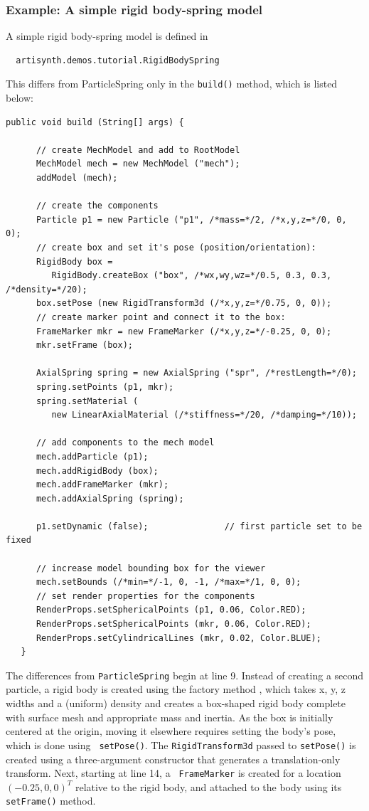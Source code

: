 \subsubsection{Example: A simple rigid body-spring model}
\label{RigidBodySpringExample:sec}

A simple rigid body-spring model is defined in
%
\begin{verbatim}
  artisynth.demos.tutorial.RigidBodySpring
\end{verbatim}
%
This differs from ParticleSpring only in the {\tt build()} method,
which is listed below:
\lstset{numbers=left}
\begin{lstlisting}[]
   public void build (String[] args) {

      // create MechModel and add to RootModel
      MechModel mech = new MechModel ("mech");
      addModel (mech);

      // create the components
      Particle p1 = new Particle ("p1", /*mass=*/2, /*x,y,z=*/0, 0, 0);
      // create box and set it's pose (position/orientation):
      RigidBody box =
         RigidBody.createBox ("box", /*wx,wy,wz=*/0.5, 0.3, 0.3, /*density=*/20);
      box.setPose (new RigidTransform3d (/*x,y,z=*/0.75, 0, 0));
      // create marker point and connect it to the box:
      FrameMarker mkr = new FrameMarker (/*x,y,z=*/-0.25, 0, 0);
      mkr.setFrame (box);

      AxialSpring spring = new AxialSpring ("spr", /*restLength=*/0);
      spring.setPoints (p1, mkr);
      spring.setMaterial (
         new LinearAxialMaterial (/*stiffness=*/20, /*damping=*/10));

      // add components to the mech model
      mech.addParticle (p1);
      mech.addRigidBody (box);
      mech.addFrameMarker (mkr);
      mech.addAxialSpring (spring);

      p1.setDynamic (false);               // first particle set to be fixed

      // increase model bounding box for the viewer
      mech.setBounds (/*min=*/-1, 0, -1, /*max=*/1, 0, 0);  
      // set render properties for the components
      RenderProps.setSphericalPoints (p1, 0.06, Color.RED);
      RenderProps.setSphericalPoints (mkr, 0.06, Color.RED);
      RenderProps.setCylindricalLines (mkr, 0.02, Color.BLUE);
   }
\end{lstlisting}
\lstset{numbers=none} 
The differences from {\tt ParticleSpring} begin
at line 9. Instead of creating a second particle, a rigid body is
created using the factory method
, which
takes x, y, z widths and a (uniform) density and creates a box-shaped
rigid body complete with surface mesh and appropriate mass and
inertia. As the box is initially centered at the origin, moving it
elsewhere requires setting the body's pose, which is done using {\tt
setPose()}. The {\tt RigidTransform3d} passed to {\tt setPose()} is
created using a three-argument constructor that generates a
translation-only transform.  Next, starting at line 14, a {\tt
FrameMarker} is created for a location $(-0.25, 0, 0)^T$ relative to the
rigid body, and attached to the body using its {\tt setFrame()}
method.

